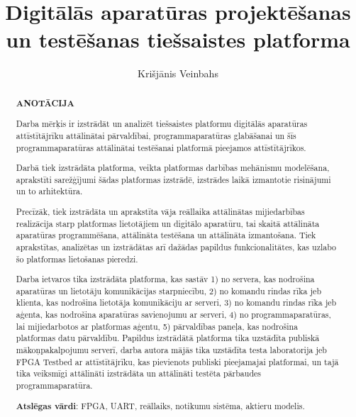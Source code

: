 \documentclass{LU}
\title{Digitālās aparatūras projektēšanas un testēšanas tiešsaistes platforma}
\author{Krišjānis Veinbahs}
\begin{document}

\maketitle

\renewcommand{\abstractname}{}
\begin{abstract}
    \thispagestyle{plain}
    \setcounter{page}{2}

    \begin{center}
    \Large\textbf{ANOTĀCIJA}\\
    \end{center}
    \vspace{1.5\baselineskip}

    Darba mērķis ir izstrādāt un analizēt tiešsaistes platformu digitālās
    aparatūras attīstītājrīku attālinātai pārvaldībai, programmaparatūras
    glabāšanai un šīs programmaparatūras attālinātai testēšanai platformā
    pieejamos attīstītājrīkos.

    Darbā tiek izstrādāta platforma, veikta platformas darbības mehānismu
    modelēšana, aprakstīti sarežģījumi šādas platformas izstrādē, izstrādes
    laikā izmantotie risinājumi un to arhitektūra.

    Precīzāk, tiek izstrādāta un aprakstīta vāja reāllaika attālinātas
    mijiedarbības realizācija starp platformas lietotājiem un digitālo
    aparatūru, tai skaitā attālināta aparatūras programmēšana, attālināta
    testēšana un attālināta izmantošana. Tiek aprakstītas, analizētas un
    izstrādātas arī dažādas papildus funkcionalitātes, kas uzlabo šo platformas
    lietošanas pieredzi.

    Darba ietvaros tika izstrādāta platforma, kas sastāv 1) no servera, kas
    nodrošina aparatūras un lietotāju komunikācijas starpniecību, 2) no komandu
    rindas rīka jeb klienta, kas nodrošina lietotāja komunikāciju ar serveri, 3)
    no komandu rindas rīka jeb aģenta, kas nodrošina aparatūras savienojumu ar
    serveri, 4) no programmaparatūras, lai mijiedarbotos ar platformas aģentu,
    5) pārvaldības paneļa, kas nodrošina platformas datu pārvaldību. Papildus
    izstrādātā platforma tika uzstādīta publiskā mākoņpakalpojumu serverī, darba
    autora mājās tika uzstādīta testa laboratorija jeb FPGA Testbed ar
    attīstītājrīku, kas pievienots publiski pieejamajai platformai, un tajā tika
    veiksmīgi attālināti izstrādāta un attālināti testēta pārbaudes
    programmaparatūra.

    \textbf{Atslēgas vārdi}: FPGA, UART, reāllaiks, notikumu sistēma, aktieru modelis.
\end{abstract}
 
\end{document}
